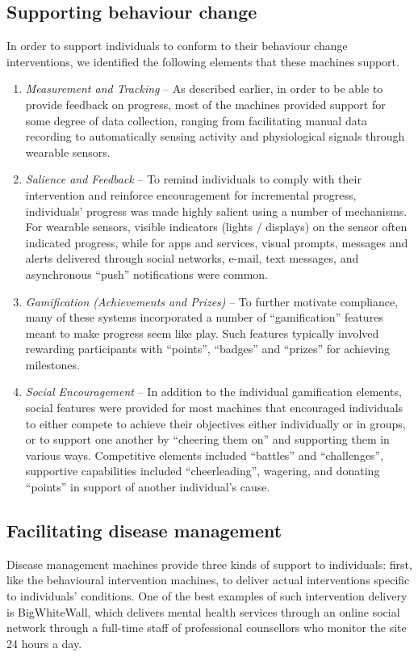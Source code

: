 \documentclass{sig-alternate}
\begin{document}
\subsection{Supporting behaviour change}
\label{sec:intervention}

In order to support individuals to conform to their behaviour change
interventions, we identified the following elements that these machines
support.

\begin{enumerate}
\item \emph{Measurement and Tracking} -- As described earlier, in order
  to be able to provide feedback on progress, most of the machines
  provided support for some degree of data collection, ranging from
  facilitating manual data recording to automatically sensing activity
  and physiological signals through wearable sensors.
\item \emph{Salience and Feedback} -- To remind individuals to comply
  with their intervention and reinforce encouragement for incremental
  progress, individuals' progress was made highly salient using a
  number of mechanisms.  For wearable sensors, visible indicators
  (lights / displays) on the sensor often indicated progress, while for
  apps and services, visual prompts, messages and alerts delivered
  through social networks, e-mail, text messages, and asynchronous
  ``push'' notifications were common.
\item \emph{Gamification (Achievements and Prizes)} -- To further
  motivate compliance, many of these systems incorporated a number of
  ``gamification'' features \cite{Deterding:2011:GUG:1979742.1979575}
  meant to make progress seem like play.  Such features typically
  involved rewarding participants with ``points'', ``badges'' and
  ``prizes'' for achieving milestones.
\item \emph{Social Encouragement} -- In addition to the individual
  gamification elements, social features were provided for most
  machines that encouraged individuals to either compete to achieve
  their objectives either individually or in groups, or to support one
  another by ``cheering them on'' and supporting them in various ways.
  Competitive elements included ``battles'' and ``challenges'', supportive
  capabilities included ``cheerleading'', wagering, and donating ``points''
  in support of another individual's cause.
\end{enumerate}

\subsection{Facilitating disease management}
Disease management machines provide three kinds of support to
individuals: first, like the behavioural intervention machines, to
deliver actual interventions specific to individuals' conditions.  One
of the best examples of such intervention delivery is BigWhiteWall,
which delivers mental health services through an online social network
through a full-time staff of professional counsellors who monitor the
site 24 hours a day.
\end{document}
